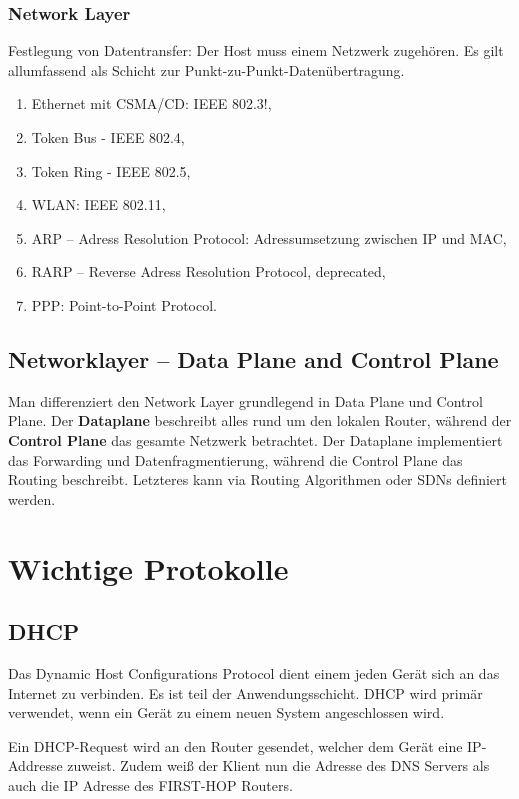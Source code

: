 \documentclass{scrartcl}
\begin{document}
    \subsubsection{Network Layer}
    \label{subsubsection:TCP_network_layer}
    Festlegung von Datentransfer: Der Host muss einem Netzwerk zugehören.
    Es gilt allumfassend als Schicht zur Punkt-zu-Punkt-Datenübertragung.
    \begin{enumerate}
        \item Ethernet mit CSMA/CD: IEEE 802.3!,
        \item Token Bus - IEEE 802.4,
        \item Token Ring - IEEE 802.5,
        \item WLAN: IEEE 802.11,
        \item ARP -- Adress Resolution Protocol: Adressumsetzung zwischen IP und MAC,
        \item RARP -- Reverse Adress Resolution Protocol, deprecated,
        \item PPP: Point-to-Point Protocol.
    \end{enumerate}
    \subsection{Networklayer -- Data Plane and Control Plane}
    Man differenziert den Network Layer grundlegend in Data Plane und Control Plane.
    Der \textbf{Dataplane} beschreibt alles rund um den lokalen Router, während der \textbf{Control Plane} das gesamte Netzwerk betrachtet.
    Der Dataplane implementiert das Forwarding und Datenfragmentierung, während die Control Plane das Routing beschreibt. Letzteres kann via Routing Algorithmen oder SDNs definiert werden.
    
\section{Wichtige Protokolle}   
    \subsection{DHCP}
    Das Dynamic Host Configurations Protocol dient einem jeden Gerät sich an das Internet zu verbinden. Es ist teil der Anwendungsschicht. DHCP wird primär verwendet, wenn ein Gerät zu einem neuen System angeschlossen wird.
    
    Ein DHCP-Request wird an den Router gesendet, welcher dem Gerät eine IP-Addresse zuweist. Zudem weiß der Klient nun die Adresse des DNS Servers als auch die IP Adresse des FIRST-HOP Routers.
    
\end{document}
